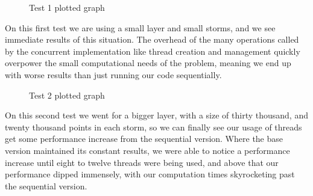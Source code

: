 \documentclass[10pt,journal,compsoc]{IEEEtran}
\begin{document}
\begin{center} \label{fig2}
    \begin{figure}[htbp]
        \caption{Test 1 plotted graph}
        \centering{\label{fig}}
    \end{figure}
\end{center}

On this first test we are using a small layer and small storms, and we see immediate results of this situation. The overhead of the many operations called by the concurrent implementation like thread creation and management quickly overpower the small computational needs of the problem, meaning we end up with worse results than just running our code sequentially.

\begin{center} \label{fig3}
    \begin{figure}[htbp]
        \caption{Test 2 plotted graph}
        \centering{\label{fig}}
    \end{figure}
\end{center}

On this second test we went for a bigger layer, with a size of thirty thousand, and twenty thousand points in each storm, so we can finally see our usage of threads get some performance increase from the sequential version. Where the base version maintained its constant results, we were able to notice a performance increase until eight to twelve threads were being used, and above that our performance dipped immensely, with our computation times skyrocketing past the sequential version.
\end{document}
